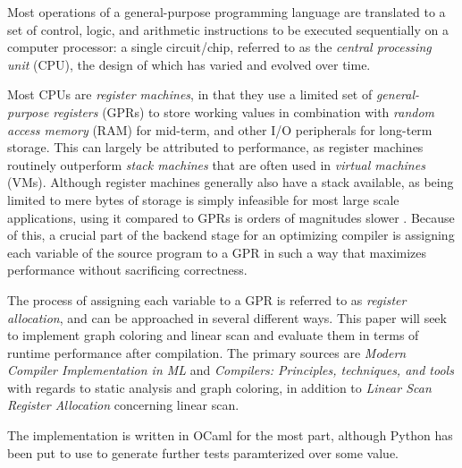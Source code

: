 \documentclass{article}
\begin{document}
\noindent Most operations of a general-purpose programming language are translated to a set of control, logic, and arithmetic instructions to be executed sequentially on a computer processor: a single circuit/chip, referred to as the \textit{central processing unit} (CPU), the design of which has varied and evolved over time.

Most CPUs are \textit{register machines}, in that they use a limited set of \textit{general-purpose registers} (GPRs) to store working values in combination with \textit{random access memory} (RAM) for mid-term, and other I/O peripherals for long-term storage. This can largely be attributed to performance, as register machines routinely outperform \textit{stack machines} \parencite{ShiYunhe2008VmsS} that are often used in \textit{virtual machines} (VMs).
Although register machines generally also have a stack available, as being limited to mere bytes of storage is simply infeasible for most large scale applications, using it compared to GPRs is orders of magnitudes slower \cite{latency}. %
Because of this, a crucial part of the backend stage for an optimizing compiler is assigning each variable  of the source program to a GPR in such a way that maximizes performance without sacrificing correctness.



The process of assigning each variable to a GPR is referred to as \textit{register allocation}, and can be approached in several different ways. This paper will seek to implement graph coloring and linear scan and evaluate them in terms of runtime performance after compilation. %
The primary sources are \textit{Modern Compiler Implementation in ML} \parencite{tiger} and \textit{Compilers: Principles, techniques, and tools} \parencite{dragon} with regards to static analysis and graph coloring, in addition to \textit{Linear Scan Register Allocation} \cite{linear} concerning linear scan.

The implementation is written in OCaml for the most part, although  Python has been put to use to generate further tests paramterized over some value.%


\end{document}
